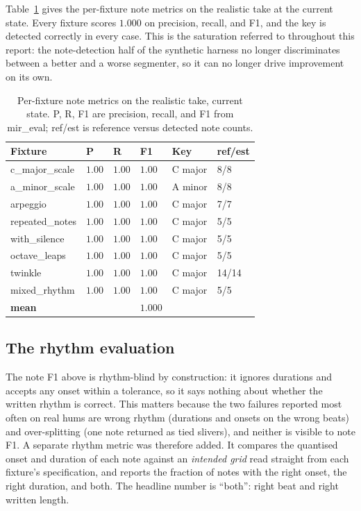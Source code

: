 \documentclass[12pt,a4paper]{article}
\begin{document}
Table~\ref{tab:note-perfixture} gives the per-fixture note metrics on the
realistic take at the current state. Every fixture scores $1.000$ on precision,
recall, and F1, and the key is detected correctly in every case. This is the
saturation referred to throughout this report: the note-detection half of the
synthetic harness no longer discriminates between a better and a worse
segmenter, so it can no longer drive improvement on its own.

\begin{table}[H]
\centering
\caption{Per-fixture note metrics on the realistic take, current state. P,
R, F1 are precision, recall, and F1 from mir\_eval; ref/est is
reference versus detected note counts.}
\label{tab:note-perfixture}
\begin{tabular}{l l l l l l}
\toprule
\textbf{Fixture} & \textbf{P} & \textbf{R} & \textbf{F1} & \textbf{Key} &
\textbf{ref/est} \\
\midrule
c\_major\_scale  & $1.00$ & $1.00$ & $1.00$ & C major & 8/8 \\
a\_minor\_scale  & $1.00$ & $1.00$ & $1.00$ & A minor & 8/8 \\
arpeggio         & $1.00$ & $1.00$ & $1.00$ & C major & 7/7 \\
repeated\_notes  & $1.00$ & $1.00$ & $1.00$ & C major & 5/5 \\
with\_silence    & $1.00$ & $1.00$ & $1.00$ & C major & 5/5 \\
octave\_leaps    & $1.00$ & $1.00$ & $1.00$ & C major & 5/5 \\
twinkle          & $1.00$ & $1.00$ & $1.00$ & C major & 14/14 \\
mixed\_rhythm    & $1.00$ & $1.00$ & $1.00$ & C major & 5/5 \\
\midrule
\textbf{mean}    &        &        & $1.000$ &        & \\
\bottomrule
\end{tabular}
\end{table}

\subsection{The rhythm evaluation}
\label{sec:results-rhythm}

The note F1 above is rhythm-blind by construction: it ignores durations and
accepts any onset within a tolerance, so it says nothing about whether the
written rhythm is correct. This matters because the two failures reported most
often on real hums are wrong rhythm (durations and onsets on the wrong beats)
and over-splitting (one note returned as tied slivers), and neither is visible
to note F1. A separate rhythm metric was therefore added. It compares the
quantised onset and duration of each note against an \emph{intended grid} read
straight from each fixture's specification, and reports the fraction of notes
with the right onset, the right duration, and both. The headline number is
``both'': right beat and right written length.
\end{document}
